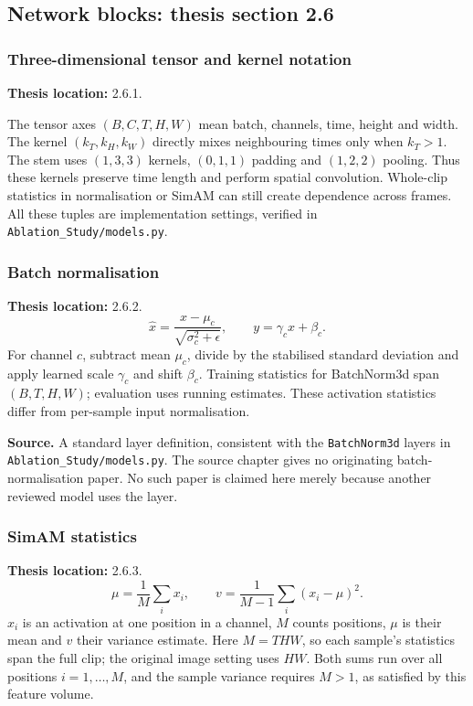 \documentclass[11pt,a4paper]{article}
\numberwithin{equation}{section}
\begin{document}
\subsection{Network blocks: thesis section 2.6}

\subsubsection{Three-dimensional tensor and kernel notation}
\label{fg:conv3d}
\textbf{Thesis location:} 2.6.1.

The tensor axes $(B,C,T,H,W)$ mean batch, channels, time, height and width.
The kernel $(k_T,k_H,k_W)$ directly mixes neighbouring times only when
$k_T>1$. The stem uses $(1,3,3)$ kernels, $(0,1,1)$ padding and $(1,2,2)$
pooling. Thus these kernels preserve time length and perform spatial
convolution. Whole-clip statistics in normalisation or SimAM can still create
dependence across frames. All these tuples are implementation settings,
verified in \texttt{Ablation\_Study/models.py}.

\subsubsection{Batch normalisation}
\label{fg:bn}
\textbf{Thesis location:} 2.6.2.
\begin{equation}
    \widehat x=\frac{x-\mu_c}{\sqrt{\sigma_c^2+\epsilon}},
    \qquad y=\gamma_c\widehat x+\beta_c.
    \label{fg:eq:bn}
\end{equation}
For channel $c$, subtract mean $\mu_c$, divide by the stabilised standard
deviation and apply learned scale $\gamma_c$ and shift $\beta_c$. Training
statistics for BatchNorm3d span $(B,T,H,W)$; evaluation uses running estimates.
These activation statistics differ from per-sample input normalisation.

\textbf{Source.} A standard layer definition, consistent with the
\texttt{BatchNorm3d} layers in \texttt{Ablation\_Study/models.py}.
The source chapter gives no originating batch-normalisation paper. No such
paper is claimed here merely because another reviewed model uses the layer.

\subsubsection{SimAM statistics}
\label{fg:simamstats}
\textbf{Thesis location:} 2.6.3.
\begin{equation}
    \mu=\frac1M\sum_i x_i,\qquad
    v=\frac1{M-1}\sum_i(x_i-\mu)^2.
    \label{fg:eq:simamstats}
\end{equation}
$x_i$ is an activation at one position in a channel, $M$ counts positions,
$\mu$ is their mean and $v$ their variance estimate. Here $M=THW$, so each
sample's statistics span the full clip; the original image setting uses $HW$.
Both sums run over all positions $i=1,\ldots,M$, and the sample variance
requires $M>1$, as satisfied by this feature volume.
\end{document}
